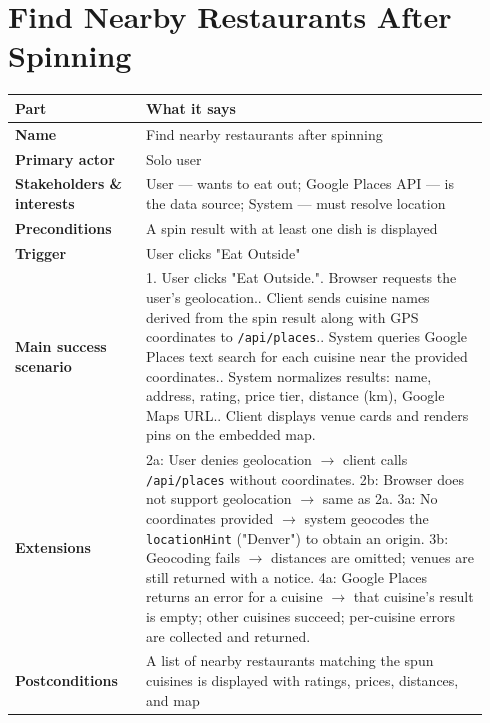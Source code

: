 \documentclass[11pt,twocolumn]{article}
\newcommand{\ucheader}{%
\textbf{Part} & \textbf{What it says} \\
\hline
\endhead
\hline
\endfoot
}
\begin{document}
\section{Find Nearby Restaurants After Spinning}
{\footnotesize
\begin{longtable}{@{}p{0.26\linewidth}p{0.68\linewidth}@{}}
\hline
\ucheader
\textbf{Name} & Find nearby restaurants after spinning \\
\hline
\textbf{Primary actor} & Solo user \\
\hline
\textbf{Stakeholders \& interests} & User --- wants to eat out; Google Places API --- is the data source; System --- must resolve location \\
\hline
\textbf{Preconditions} & A spin result with at least one dish is displayed \\
\hline
\textbf{Trigger} & User clicks "Eat Outside" \\
\hline
\textbf{Main success scenario} & 1. User clicks "Eat Outside."\newline
2. Browser requests the user's geolocation.\newline
3. Client sends cuisine names derived from the spin result along with GPS coordinates to \texttt{/api/places}.\newline
4. System queries Google Places text search for each cuisine near the provided coordinates.\newline
5. System normalizes results: name, address, rating, price tier, distance (km), Google Maps URL.\newline
6. Client displays venue cards and renders pins on the embedded map. \\
\hline
\textbf{Extensions} & 2a: User denies geolocation $\rightarrow$ client calls \texttt{/api/places} without coordinates.\newline
2b: Browser does not support geolocation $\rightarrow$ same as 2a.\newline
3a: No coordinates provided $\rightarrow$ system geocodes the \texttt{locationHint} ("Denver") to obtain an origin.\newline
3b: Geocoding fails $\rightarrow$ distances are omitted; venues are still returned with a notice.\newline
4a: Google Places returns an error for a cuisine $\rightarrow$ that cuisine's result is empty; other cuisines succeed; per-cuisine errors are collected and returned. \\
\hline
\textbf{Postconditions} & A list of nearby restaurants matching the spun cuisines is displayed with ratings, prices, distances, and map \\
\hline
\end{longtable}
}
\end{document}
